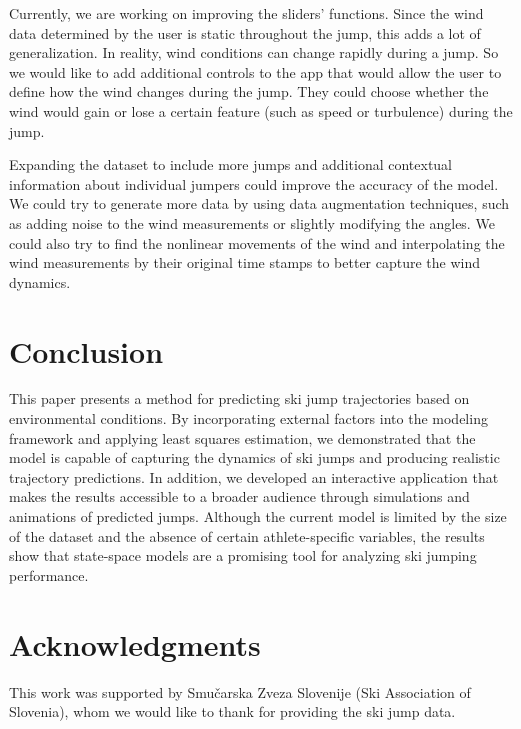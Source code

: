 \documentclass[sigconf]{acmart}
\begin{document}
Currently, we are working on improving the sliders’ functions. Since the wind
data determined by the user is static throughout the jump, this adds a lot of
generalization. In reality, wind conditions can change rapidly during a jump.
So we would like to add additional controls to the app that would allow the
user to define how the wind changes during the jump. They could choose whether
the wind would gain or lose a certain feature (such as speed or turbulence)
during the jump.

Expanding the dataset to include more jumps and additional contextual
information about individual jumpers could improve the accuracy of the model.
We could try to generate more data by using data augmentation techniques, such
as adding noise to the wind measurements or slightly modifying the angles. We
could also try to find the nonlinear movements of the wind and interpolating
the wind measurements by their original time stamps to better capture the wind
dynamics.

\section{Conclusion}
This paper presents a method for predicting ski jump trajectories based on
environmental conditions. By incorporating external factors into the modeling
framework and applying least squares estimation, we demonstrated that the model
is capable of capturing the dynamics of ski jumps and producing realistic
trajectory predictions. In addition, we developed an interactive application
that makes the results accessible to a broader audience through simulations and
animations of predicted jumps. Although the current model is limited by the size
of the dataset and the absence of certain athlete-specific variables, the
results show that state-space models are a promising tool for analyzing ski
jumping performance.

\section{Acknowledgments}
This work was supported by Smučarska Zveza Slovenije (Ski Association of
Slovenia), whom we would like to thank for providing the ski jump data.



\end{document}
